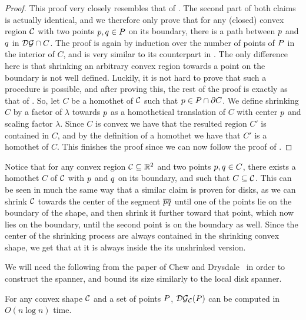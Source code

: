 \documentclass[12pt]{article}%
\begin{document}
\begin{proof}
    This proof very closely resembles that of
    . The second part of both claims is actually
    identical, and we therefore only prove that for any (closed)
    convex region $\mathcal{C}$ with two points $p,q\in P$ on its
    boundary, there is a path between $p$ and $q$ in
    $\mathcal{DG} \cap {C}$.  The proof is again by induction over the
    number of points of $P$ in the interior of $C$, and is very
    similar to its counterpart in . The only
    difference here is that shrinking an arbitrary convex region
    towards a point on the boundary is not well defined.  Luckily, it
    is not hard to prove that such a procedure is possible, and after
    proving this, the rest of the proof is exactly as that of
    .  So, let $C$ be a homothet of $\mathcal{C}$ such
    that $p\in P\cap\partial C$. We define shrinking $C$ by a
    factor of $\lambda$ towards $p$ as a homothetical translation of
    $C$ with center $p$ and scaling factor $\lambda$. Since $C$ is
    convex we have that the resulted region $C'$ is contained in $C$,
    and by the definition of a homothet we have that $C'$ is a
    homothet of $C$.  This finishes the proof since we can now follow
    the proof of .

\end{proof}

Notice that for any convex region $\mathcal{C}\subseteq \mathbb{R}^2$ and two points
$p,q \in C$, there exists a homothet $C$ of $\mathcal{C}$ with $p$ and
$q$ on its boundary, and such that $C\subseteq \mathcal{C}$. This can be
seen in much the same way that a similar claim is proven for disks, as
we can shrink $\mathcal{C}$ towards the center of the segment
$\overline{pq}$ until one of the points lie on the boundary of the
shape, and then shrink it further toward that point, which now lies on
the boundary, until the second point is on the boundary as well. Since
the center of the shrinking process are always contained in the
shrinking convex shape, we get that at it is always inside the its
unshrinked version.


We will need the following from the paper of Chew and
Drysdale~\cite{cd-vdbcdf-85} in order to construct the spanner, and
bound its size similarly to the local disk spanner.

\begin{theorem}
    For any convex shape $\mathcal{C}$ and a set of points $P$,
    $\mathcal{DG}_{\mathcal{C}}(P)$ can be computed in $O(n \log n)$ time.
\end{theorem}
\end{document}
